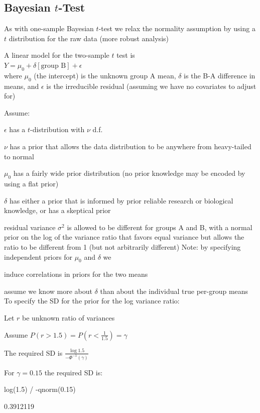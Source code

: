 \subsection{Bayesian $t$-Test}
\bi
\item As with one-sample Bayesian $t$-test we relax the normality assumption by using a $t$ distribution for the raw data (more robust analysis)
\item A linear model for the two-sample $t$ test is\\
  $Y = \mu_{0} + \delta[\textrm{group B}] + \epsilon$\\
  where $\mu_{0}$ (the intercept) is the unknown group A mean, $\delta$ is the B-A difference in means, and $\epsilon$ is the irreducible residual (assuming we have no covariates to adjust for)
\item Assume:
 \bi
 \item $\epsilon$ has a $t$-distribution with $\nu$ d.f.
 \item $\nu$ has a prior that allows the data distribution to be anywhere from heavy-tailed to normal
 \item $\mu_{0}$ has a fairly wide prior distribution (no prior knowledge may be encoded by using a flat prior)
 \item $\delta$ has either a prior that is informed by prior reliable research or biological knowledge, or has a skeptical prior
 \item residual variance $\sigma^2$ is allowed to be different for groups A and B, with a normal prior on the log of the variance ratio that favors equal variance but allows the ratio to be different from 1 (but not arbitrarily different)
 \ei
Note: by specifying independent priors for $\mu_{0}$ and $\delta$ we
 \bi
 \item induce correlations in priors for the two means
 \item assume we know more about $\delta$ than about the individual true per-group means 
 \ei
\ei
To specify the SD for the prior for the log variance ratio:
\bi
\item Let $r$ be unknown ratio of variances
\item Assume $P(r > 1.5) = P(r < \frac{1}{1.5}) = \gamma$
\item The required SD is $\frac{\log{1.5}}{-\Phi^{-1}(\gamma)}$
\item For $\gamma=0.15$ the required SD is:
\begin{Schunk}
\begin{Sinput}
log(1.5) / -qnorm(0.15)
\end{Sinput}
\begin{Soutput}
[1] 0.3912119
\end{Soutput}
\end{Schunk}

